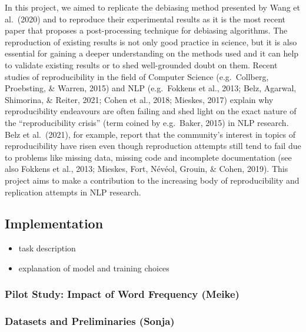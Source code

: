 \documentclass[
  english,
  man,floatsintext]{apa6}
\providecommand{\tightlist}{%
  \setlength{\itemsep}{0pt}\setlength{\parskip}{0pt}}
\begin{document}
In this project, we aimed to replicate the debiasing method presented by Wang et al.~(2020) and to reproduce their experimental results as it is the most recent paper that proposes a post-processing technique for debiasing algorithms.
The reproduction of existing results is not only good practice in science, but it is also essential for gaining a deeper understanding on the methods used and it can help to validate existing results or to shed well-grounded doubt on them. Recent studies of reproducibility in the field of Computer Science (e.g.~Collberg, Proebsting, \& Warren, 2015) and NLP (e.g.~Fokkens et al., 2013; Belz, Agarwal, Shimorina, \& Reiter, 2021; Cohen et al., 2018; Mieskes, 2017) explain why reproducibility endeavours are often failing and shed light on the exact nature of the \enquote{reproducibility crisis} (term coined by e.g.~Baker, 2015) in NLP research. Belz et al.~(2021), for example, report that the community's interest in topics of reproducibility have risen even though reproduction attempts still tend to fail due to problems like missing data, missing code and incomplete documentation (see also Fokkens et al., 2013; Mieskes, Fort, Névéol, Grouin, \& Cohen, 2019).
This project aims to make a contribution to the increasing body of reproducibility and replication attempts in NLP research.

\hypertarget{implementation}{%
\subsection{Implementation}\label{implementation}}

\begin{itemize}
\tightlist
\item
  task description
\item
  explanation of model and training choices
\end{itemize}

\hypertarget{pilot-study-impact-of-word-frequency-meike}{%
\subsubsection{Pilot Study: Impact of Word Frequency (Meike)}\label{pilot-study-impact-of-word-frequency-meike}}

\hypertarget{datasets-and-preliminaries-sonja}{%
\subsubsection{Datasets and Preliminaries (Sonja)}\label{datasets-and-preliminaries-sonja}}
\end{document}
